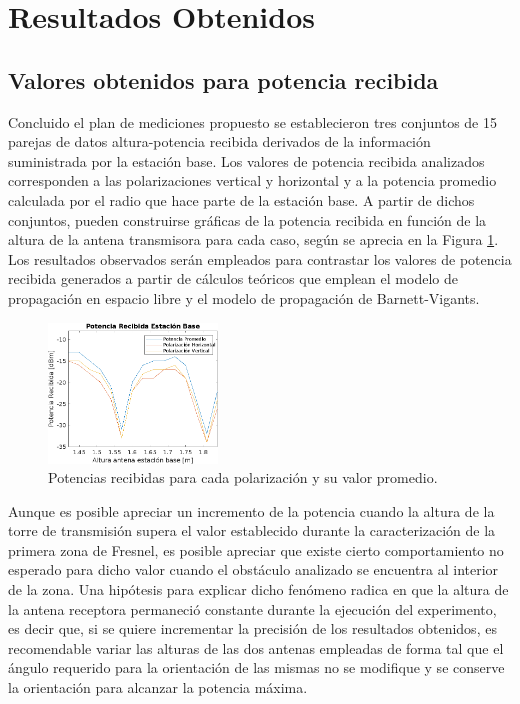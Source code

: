 \documentclass[conference]{IEEEtran}
\begin{document}
\section{Resultados Obtenidos}
\subsection{Valores obtenidos para potencia recibida}
Concluido el plan de mediciones propuesto se establecieron tres conjuntos de 15 parejas de datos altura-potencia recibida derivados de la información suministrada
por la estación base. Los valores de potencia recibida analizados corresponden a las polarizaciones vertical y horizontal y a la potencia
promedio calculada por el radio que hace parte de la estación base. A partir de dichos conjuntos, pueden construirse gráficas de la potencia recibida en función de la 
altura de la antena transmisora para cada caso, según se aprecia en la Figura \ref{fig:Potencias}. Los resultados observados serán empleados para contrastar los valores de potencia 
recibida generados a partir de cálculos teóricos que emplean el modelo de propagación en espacio libre y el modelo de propagación de Barnett-Vigants.
\begin{figure}
    \centering
          \includegraphics[width=0.4\textwidth]{Potencias.png}
        \caption{Potencias recibidas para cada polarización y su valor promedio.
        }
        \label{fig:Potencias}
\end{figure}
Aunque es posible apreciar un incremento de la potencia cuando la altura de la torre de transmisión supera el valor establecido
durante la caracterización de la primera zona de Fresnel, es posible apreciar que existe cierto comportamiento no esperado para dicho valor
cuando el obstáculo analizado se encuentra al interior de la zona. Una hipótesis para explicar dicho fenómeno radica en que la altura de la
antena receptora permaneció constante durante la ejecución del experimento, es decir que, si se quiere incrementar la precisión de los resultados
obtenidos, es recomendable variar las alturas de las dos antenas empleadas de forma tal que el ángulo requerido para la orientación de las 
mismas no se modifique y se conserve la orientación para alcanzar la potencia máxima.
\end{document}
